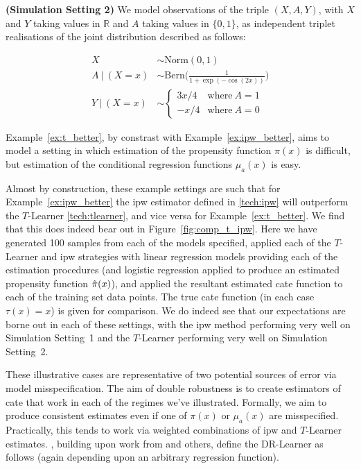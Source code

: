 \documentclass[../thesis.tex]{subfiles}
\begin{document}
\begin{example}{\textbf{(Simulation Setting 2)}} \label{ex:t_better}
We model observations of the triple $(X, A, Y)$, with $X$ and $Y$ taking values in $\mathbb{R}$ and $A$ taking values in $\{0,1\}$, as independent triplet realisations of the joint distribution described as follows:

\begin{align*}
X  & \sim \mathrm{Norm}(0, 1) \\    
A \ | \ (X = x) & \sim \mathrm{Bern}\Big(\frac{1}{1 + \exp(-\cos(2x))}\Big) \\ 
Y \ | \ (X = x) & \sim \begin{cases}
      3x/4 & \text{where} \ A = 1\\
      -x/4 & \text{where} \ A = 0
    \end{cases}
\end{align*}
\end{example}

Example~\ref{ex:t_better}, by constrast with Example~\ref{ex:ipw_better}, aims to model a setting in which estimation of the propensity function $\pi(x)$ is difficult, but estimation of the conditional regression functions $\mu_a(x)$ is easy. 

Almost by construction, these example settings are such that for Example~\ref{ex:ipw_better} the \gls{ipw} estimator defined in \eqref{tech:ipw} will outperform the $T$-Learner \eqref{tech:tlearner}, and vice versa for Example~\ref{ex:t_better}. We find that this does indeed bear out in Figure~\ref{fig:comp_t_ipw}. Here we have generated 100 samples from each of the models specified, applied each of the $T$-Learner and \gls{ipw} strategies with linear regression models providing each of the estimation procedures (and logistic regression applied to produce an estimated propensity function $\hat{\pi}(x)$), and applied the resultant estimated \gls{cate} function to each of the training set data points. The true \gls{cate} function (in each case $\tau(x) = x$) is given for comparison. We do indeed see that our expectations are borne out in each of these settings, with the \gls{ipw} method performing very well on Simulation Setting~1 and the $T$-Learner performing very well on Simulation Setting~2.

These illustrative cases are representative of two potential sources of error via model misspecification. The aim of double robustness is to create estimators of \gls{cate} that work in each of the regimes we've illustrated. Formally, we aim to produce consistent estimates even if one of $\pi(x)$ or $\mu_a(x)$ are misspecified. Practically, this tends to work via weighted combinations of \gls{ipw} and $T$-Learner estimates. \citet{kennedy_towards_2022}, building upon work from \citet{nie_quasi-oracle_2021} and others, define the DR-Learner as follows (again depending upon an arbitrary regression function). 
\end{document}
